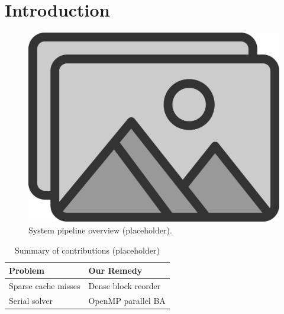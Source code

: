 \section{Introduction}


\begin{figure}[t]
  \centering
  \includegraphics[width=0.9\linewidth]{figs/placeholder}
  \caption{System pipeline overview (placeholder).}
  \label{fig:intro_pipeline}
\end{figure}

\begin{table}[b]
  \caption{Summary of contributions (placeholder)}
  \label{tab:intro_contrib}
  \centering
  \begin{tabular}{@{}ll@{}}
    \toprule
    Problem & Our Remedy \\ \midrule
    Sparse cache misses & Dense block reorder \\
    Serial solver & OpenMP parallel BA \\ \bottomrule
  \end{tabular}
\end{table}

